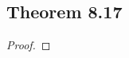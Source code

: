 \documentclass[../../main.tex]{subfiles}
\begin{document}
\subsection{Theorem 8.17}
\begin{wts}

\end{wts}
\begin{proof}

\end{proof}
\end{document}
